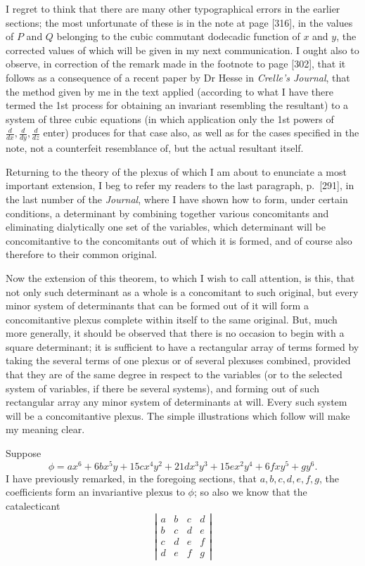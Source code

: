 \documentclass[11pt]{article}
\newcommand{\sourcepage}[1]{\marginpar{\scriptsize p.~#1}}
\begin{document}
{{\sourcepage{346}
I regret to think that there are many other typographical errors in the earlier sections; the most unfortunate of these is in the note at page [316], in the values of $P$ and $Q$ belonging to the cubic commutant dodecadic function of $x$ and $y$, the corrected values of which will be given in my next communication. I ought also to observe, in correction of the remark made in the footnote to page [302], that it follows as a consequence of a recent paper by Dr Hesse in \emph{Crelle's Journal}, that the method given by me in the text applied (according to what I have there termed the 1st process for obtaining an invariant resembling the resultant) to a system of three cubic equations (in which application only the 1st powers of $\frac{d}{dx},\frac{d}{dy},\frac{d}{dz}$ enter) produces for that case also, as well as for the cases specified in the note, not a counterfeit resemblance of, but the actual resultant itself.

Returning to the theory of the plexus of which I am about to enunciate a most important extension, I beg to refer my readers to the last paragraph, p.~[291], in the last number of the \emph{Journal}, where I have shown how to form, under certain conditions, a determinant by combining together various concomitants and eliminating dialytically one set of the variables, which determinant will be concomitantive to the concomitants out of which it is formed, and of course also therefore to their common original.

Now the extension of this theorem, to which I wish to call attention, is this, that not only such determinant as a whole is a concomitant to such original, but every minor system of determinants that can be formed out of it will form a concomitantive plexus complete within itself to the same original. But, much more generally, it should be observed that there is no occasion to begin with a square determinant; it is sufficient to have a rectangular array of terms formed by taking the several terms of one plexus or of several plexuses combined, provided that they are of the same degree in respect to the variables (or to the selected system of variables, if there be several systems), and forming out of such rectangular array any minor system of determinants at will. Every such system will be a concomitantive plexus. The simple illustrations which follow will make my meaning clear.

Suppose
\[
\phi=ax^6+6bx^5y+15cx^4y^2+21dx^3y^3+15ex^2y^4+6fxy^5+gy^6.
\]
I have previously remarked, in the foregoing sections, that $a,b,c,d,e,f,g$, the coefficients form an invariantive plexus to $\phi$; so also we know that the catalecticant
\[
\left|\begin{array}{cccc}
a&b&c&d\\
b&c&d&e\\
c&d&e&f\\
d&e&f&g
\end{array}\right|
\]

}}
\end{document}
